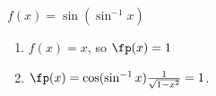 {$f(x) =\sin (\sin^{-1}x)$
}
{\begin{enumerate}
\item		$f(x) = x$, so $\fp(x) = 1$
\item		$\fp(x) = \cos(\sin^{-1}x)\frac{1}{\sqrt{1-x^2}} = 1$.
\end{enumerate}
}
